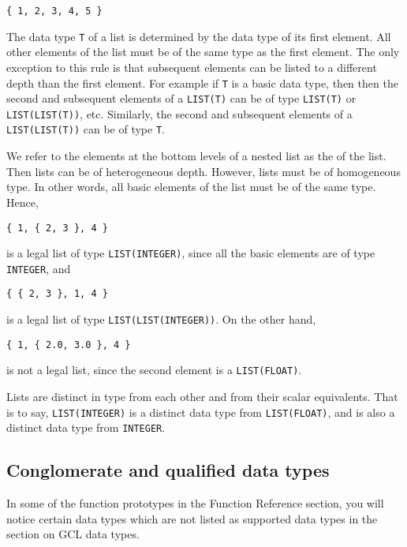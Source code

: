\begin{verbatim}
{ 1, 2, 3, 4, 5 }
\end{verbatim}

\noindent 
The data type \verb+T+ of a list is determined by the data type of its
first element.  All other elements of the list must be of the same
type as the first element.  The only exception to this rule is that
subsequent elements can be listed to a different depth than the first
element.  For example if \verb+T+ is a basic data type, then then the
second and subsequent elements of a \verb+LIST(T)+ can be of type
\verb+LIST(T)+ or \verb+LIST(LIST(T))+, etc.  Similarly, the second
and subsequent elements of a \verb+LIST(LIST(T))+ can be of type
\verb+T+.  

We refer to the elements at the bottom levels of a nested list as the
 of the list.  Then lists can be of heterogeneous
depth.  However, lists must be of homogeneous type. In other words,
all basic elements of the list must be of the same type.  Hence,

\begin{verbatim}
{ 1, { 2, 3 }, 4 }
\end{verbatim}

\noindent 
is a legal list of type \verb+LIST(INTEGER)+, since all the basic
elements are of type {\tt INTEGER}, and 

\begin{verbatim}
{ { 2, 3 }, 1, 4 }
\end{verbatim}

\noindent 
is a legal list of type \verb+LIST(LIST(INTEGER))+.  On the other
hand, 

\begin{verbatim}
{ 1, { 2.0, 3.0 }, 4 }
\end{verbatim}

\noindent 
is not a legal list, since the second element is a {\tt LIST(FLOAT)}.

Lists are distinct in type from each other and from their scalar
equivalents.  That is to say, {\tt LIST(INTEGER)} is a distinct data
type from {\tt LIST(FLOAT)}, and is also a distinct data type from
{\tt INTEGER}.
 
\subsection{Conglomerate and qualified data types}

In some of the function prototypes in the Function Reference section,
you will notice certain data types which are not listed as supported
data types in the section on GCL data types. 

